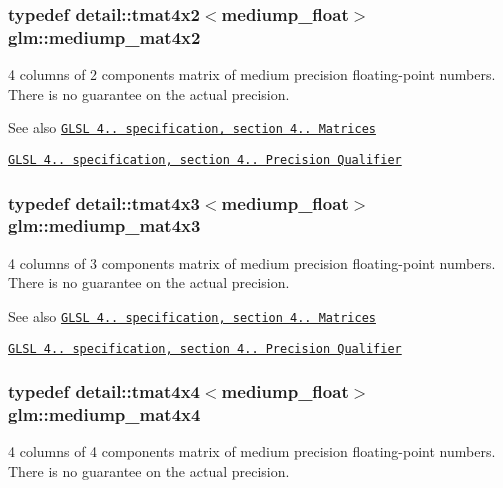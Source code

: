 \subsubsection[{mediump\+\_\+mat4x2}]{\setlength{\rightskip}{0pt plus 5cm}typedef detail\+::tmat4x2$<$mediump\+\_\+float$>$ {\bf glm\+::mediump\+\_\+mat4x2}}\label{group__core__precision_gad8c4b5a61db5087e32506b2022442edd}
4 columns of 2 components matrix of medium precision floating-\/point numbers. There is no guarantee on the actual precision.

\begin{DoxySeeAlso}{See also}
\href{http://www.opengl.org/registry/doc/GLSLangSpec.4.20.8.pdf}{\tt G\+L\+S\+L 4.. specification, section 4.. Matrices} 

\href{http://www.opengl.org/registry/doc/GLSLangSpec.4.20.8.pdf}{\tt G\+L\+S\+L 4.. specification, section 4.. Precision Qualifier} 
\end{DoxySeeAlso}
\hypertarget{group__core__precision_ga2c1b39d629d83063a0d59cf14b4f52a3}{}
\subsubsection[{mediump\+\_\+mat4x3}]{\setlength{\rightskip}{0pt plus 5cm}typedef detail\+::tmat4x3$<$mediump\+\_\+float$>$ {\bf glm\+::mediump\+\_\+mat4x3}}\label{group__core__precision_ga2c1b39d629d83063a0d59cf14b4f52a3}
4 columns of 3 components matrix of medium precision floating-\/point numbers. There is no guarantee on the actual precision.

\begin{DoxySeeAlso}{See also}
\href{http://www.opengl.org/registry/doc/GLSLangSpec.4.20.8.pdf}{\tt G\+L\+S\+L 4.. specification, section 4.. Matrices} 

\href{http://www.opengl.org/registry/doc/GLSLangSpec.4.20.8.pdf}{\tt G\+L\+S\+L 4.. specification, section 4.. Precision Qualifier} 
\end{DoxySeeAlso}
\hypertarget{group__core__precision_ga6023cdb8df00d662cb6c1bce2632381a}{}
\subsubsection[{mediump\+\_\+mat4x4}]{\setlength{\rightskip}{0pt plus 5cm}typedef detail\+::tmat4x4$<$mediump\+\_\+float$>$ {\bf glm\+::mediump\+\_\+mat4x4}}\label{group__core__precision_ga6023cdb8df00d662cb6c1bce2632381a}
4 columns of 4 components matrix of medium precision floating-\/point numbers. There is no guarantee on the actual precision.

